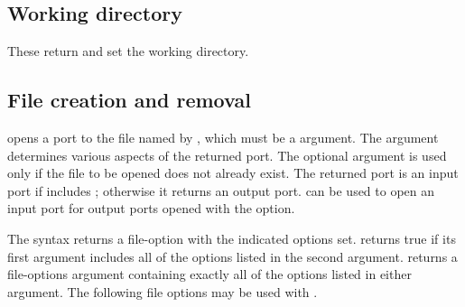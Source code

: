 \subsection{Working directory}

\begin{protos}
\end{protos}
\noindent
These return and set the working directory.

\subsection{File creation and removal}

\begin{protos}
\end{protos}
\noindent
{} opens a port to the file named by , which
must be a  argument.
The  argument determines various aspects of the 
 returned port.
The optional  argument is used only if the file to be opened
 does not already exist.
The returned port is an input port if  includes
 ; otherwise it returns an output port.
 can be used to open an input port for
 output ports opened with the  option.

\begin{protos}
\end{protos}
\noindent
The syntax  returns a file-option with the
 indicated options set.
 returns true if its first argument includes all of
 the options listed in the second argument.  
returns a file-options argument containing exactly all of the options
listed in either argument.
The following file options may be used with .

